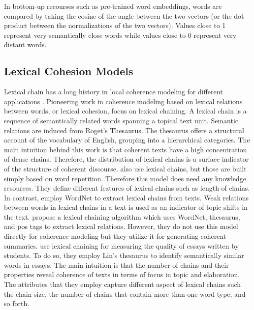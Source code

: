 In bottom-up recourses such as pre-trained word embeddings, words are compared by taking the cosine of the angle between the two vectors (or the dot product between the normalizations of the two vectors). Values close to 1 represent very semantically close words while values close to 0 represent very distant words. 

\subsection{Lexical Cohesion Models}

Lexical chain has a long history in local coherence modeling for different applications \cite{benguosheng13,wongbillytm12,fenglijun09,flor13}. 
Pioneering work \cite{morris91,hirst95} in coherence modeling based on lexical relations between words, or lexical cohesion, focus on lexical chaining. 
A lexical chain is a sequence of semantically related words spanning a topical text unit. 
Semantic relations are induced from Roget's Thesaurus. 
The thesaurus offers a structural account of the vocabulary of English, grouping into a hierarchical  categories. 
The main intuition behind this work is that coherent texts have a high concentration of dense chains. 
Therefore, the distribution of lexical chains is a surface indicator of the structure of coherent discourse. 
 also use lexical chains, but those are built simply based on word repetition. 
Therefore this model does need any knowledge resources.  
They define different features of lexical chains such as length of chains. 
In contrast,  employ WordNet to extract lexical chains from texts.  
Weak relations between words in lexical chains in a text is used as an indicator of topic shifts in the text. 
 propose a lexical chaining algorithm which uses WordNet, thesaurus, and pos tags to extract lexical relations. 
However, they do not use this model directly for coherence modeling but they utilize it for generating coherent summaries. 
 use lexical chaining for measuring the quality of essays written by students. 
To do so, they employ Lin’s thesaurus \cite{lindekang98} to identify semantically similar words in essays.   
The main intuition is that the number of chains and their properties reveal coherence of texts in terms of focus in topic and elaboration. 
The attributes that they employ capture different aspect of lexical chains such the chain size, the number of chains that contain more than one word type, and so forth. 
